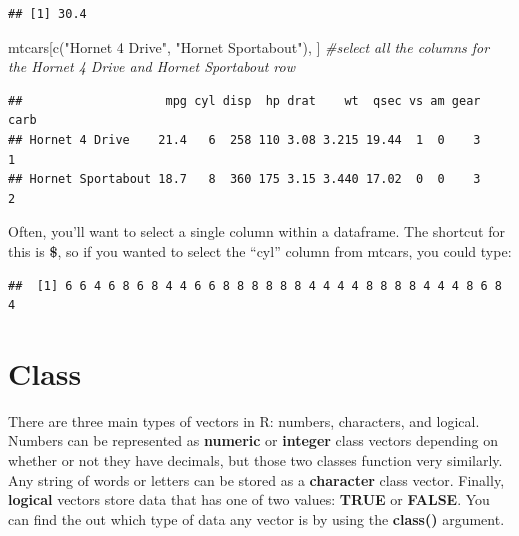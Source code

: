 \documentclass[
]{book}
\newenvironment{Shaded}{\begin{snugshade}}{\end{snugshade}}
\newcommand{\CommentTok}[1]{\textcolor[rgb]{0.56,0.35,0.01}{\textit{#1}}}
\newcommand{\FunctionTok}[1]{\textcolor[rgb]{0.00,0.00,0.00}{#1}}
\newcommand{\NormalTok}[1]{#1}
\newcommand{\SpecialCharTok}[1]{\textcolor[rgb]{0.00,0.00,0.00}{#1}}
\newcommand{\StringTok}[1]{\textcolor[rgb]{0.31,0.60,0.02}{#1}}
\begin{document}
\begin{verbatim}
## [1] 30.4
\end{verbatim}

\begin{Shaded}
\begin{Highlighting}[]
\NormalTok{mtcars[}\FunctionTok{c}\NormalTok{(}\StringTok{"Hornet 4 Drive"}\NormalTok{, }\StringTok{"Hornet Sportabout"}\NormalTok{), ] }\CommentTok{\#select all the columns for the Hornet 4 Drive and Hornet Sportabout row}
\end{Highlighting}
\end{Shaded}

\begin{verbatim}
##                    mpg cyl disp  hp drat    wt  qsec vs am gear carb
## Hornet 4 Drive    21.4   6  258 110 3.08 3.215 19.44  1  0    3    1
## Hornet Sportabout 18.7   8  360 175 3.15 3.440 17.02  0  0    3    2
\end{verbatim}

Often, you'll want to select a single column within a dataframe. The shortcut for this is \textbf{\$}, so if you wanted to select the ``cyl'' column from mtcars, you could type:

\begin{Shaded}
\end{Shaded}

\begin{verbatim}
##  [1] 6 6 4 6 8 6 8 4 4 6 6 8 8 8 8 8 8 4 4 4 4 8 8 8 8 4 4 4 8 6 8 4
\end{verbatim}

\hypertarget{class}{%
\section{Class}\label{class}}

There are three main types of vectors in R: numbers, characters, and logical. Numbers can be represented as \textbf{numeric} or \textbf{integer} class vectors depending on whether or not they have decimals, but those two classes function very similarly. Any string of words or letters can be stored as a \textbf{character} class vector. Finally, \textbf{logical} vectors store data that has one of two values: \textbf{TRUE} or \textbf{FALSE}. You can find the out which type of data any vector is by using the \textbf{class()} argument.
\end{document}
